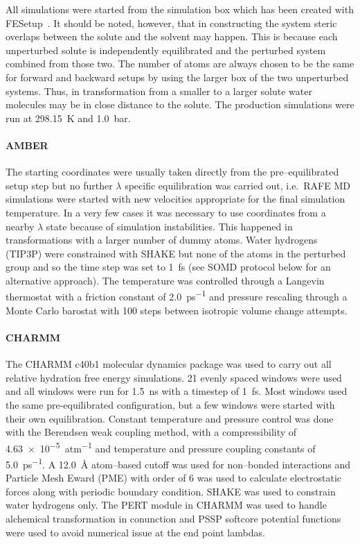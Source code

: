 \documentclass[journal=jctcce,manuscript=article]{achemso}
\begin{document}
All simulations were started from the simulation box which has been 
created with FESetup~\cite{loeffler_fesetup:_2015}.  It should be noted, 
however, that in constructing the system steric overlaps between the solute and 
the solvent may happen.  This is because each unperturbed solute is 
independently equilibrated and the perturbed system combined from those two.  
The number of atoms are always chosen to be the same for forward and backward 
setups by using the larger box of the two unperturbed systems.  Thus, in 
transformation from a smaller to a larger solute water molecules may be in 
close distance to the solute.  The production simulations were run at 
\SI{298.15}{K} and \SI{1.0}{bar}.

\paragraph{AMBER} The starting coordinates were usually taken directly from the
pre--equilibrated setup step but no further $\lambda$ specific equilibration 
was carried out, i.e.\ RAFE MD simulations were started with new velocities 
appropriate for the 
final simulation temperature.  In a very few cases it was necessary to use 
coordinates from a nearby $\lambda$ state because of simulation instabilities.  
This happened in transformations with a larger number of dummy atoms.  Water 
hydrogens (TIP3P) were constrained with SHAKE but none of the atoms in the 
perturbed group and so the time step was set to \SI{1}{fs} (see SOMD protocol 
below for an alternative approach).  The temperature was controlled through a 
Langevin thermostat with a friction constant of \SI{2.0}{ps^{-1}} and pressure 
rescaling through a Monte Carlo barostat with 100 steps between isotropic 
volume change attempts.

\paragraph{CHARMM} The CHARMM c40b1 molecular dynamics package was used to 
carry out all relative hydration free energy simulations.  21 evenly spaced 
windows were used and all windows were run for \SI{1.5}{ns} with a timestep of 
\SI{1}{fs}.  Most windows used the same pre-equilibrated configuration, but a 
few windows were started with their own equilibration.  Constant temperature 
and pressure control was done with the Berendsen weak coupling method, with a 
compressibility of \SI{4.63e-5}{atm^{-1}} and temperature and pressure coupling 
constants of \SI{5.0}{ps^{-1}}.  A \SI{12.0}{\angstrom} atom--based cutoff was 
used for non--bonded interactions and Particle Mesh Eward (PME) with order of 6 
was used to calculate electrostatic forces along with periodic boundary 
condition.  SHAKE was used to constrain water hydrogens only.  The PERT module 
in CHARMM was used to handle alchemical transformation in conunction and PSSP 
softcore potential functions were used to avoid numerical issue at the end 
point lambdas.
\end{document}
